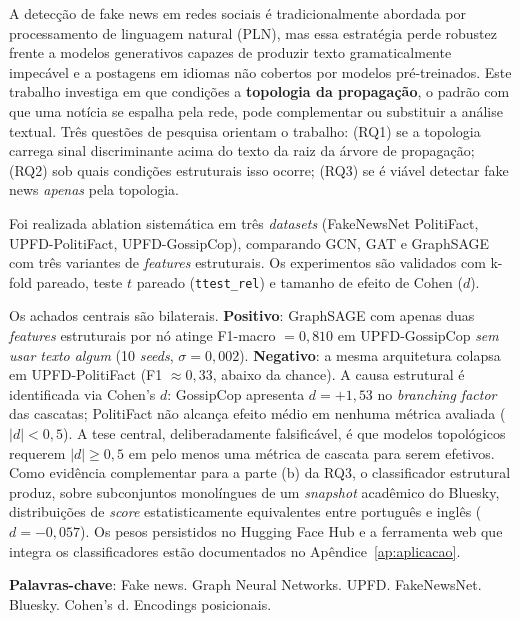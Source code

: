 \documentclass[12pt,oneside,a4paper]{abntex2}
\begin{document}

\imprimircapa
\imprimirfolhaderosto
\imprimirfolhadeaprovacao


\begin{resumo}
A detec\c{c}\~ao de fake news em redes sociais \'e tradicionalmente
abordada por processamento de linguagem natural (PLN), mas essa
estrat\'egia perde robustez frente a modelos generativos capazes de
produzir texto gramaticalmente impec\'avel e a postagens em idiomas
n\~ao cobertos por modelos pr\'e-treinados. Este trabalho investiga em
que condi\c{c}\~oes a \textbf{topologia da propaga\c{c}\~ao}, o padr\~ao
com que uma not\'icia se espalha pela rede, pode complementar ou
substituir a an\'alise textual. Tr\^es quest\~oes de pesquisa orientam o
trabalho: (RQ1) se a topologia carrega sinal discriminante acima do texto
da raiz da \'arvore de propaga\c{c}\~ao; (RQ2) sob quais condi\c{c}\~oes
estruturais isso ocorre; (RQ3) se \'e vi\'avel detectar fake news \emph{apenas} pela
topologia.

Foi realizada ablation sistem\'atica em tr\^es \emph{datasets} (FakeNewsNet
PolitiFact, UPFD-PolitiFact, UPFD-GossipCop), comparando GCN, GAT e
GraphSAGE com tr\^es variantes de \emph{features} estruturais. Os
experimentos s\~ao validados com k-fold pareado, teste $t$ pareado
(\texttt{ttest\_rel}) e tamanho de efeito de Cohen ($d$).

Os achados centrais s\~ao bilaterais. \textbf{Positivo}: GraphSAGE com
apenas duas \emph{features} estruturais por n\'o atinge F1-macro $=
0{,}810$ em UPFD-GossipCop \emph{sem usar texto algum} (10 \emph{seeds},
$\sigma = 0{,}002$). \textbf{Negativo}: a mesma arquitetura colapsa em
UPFD-PolitiFact (F1 $\approx 0{,}33$, abaixo da chance). A causa
estrutural \'e identificada via Cohen's $d$: GossipCop apresenta $d =
+1{,}53$ no \emph{branching factor} das cascatas; PolitiFact n\~ao
alcan\c{c}a efeito m\'edio em nenhuma m\'etrica avaliada ($|d| < 0{,}5$).
A tese central, deliberadamente falsific\'avel, \'e que modelos
topol\'ogicos requerem $|d| \geq 0{,}5$ em pelo menos uma m\'etrica de
cascata para serem efetivos. Como evid\^encia complementar para a parte
(b) da RQ3, o classificador estrutural produz, sobre subconjuntos
monol\'ingues de um \emph{snapshot} acad\^emico do Bluesky,
distribui\c{c}\~oes de \emph{score} estatisticamente equivalentes entre
portugu\^es e ingl\^es ($d = -0{,}057$). Os pesos persistidos no
Hugging Face Hub e a ferramenta web que integra os classificadores
est\~ao documentados no Ap\^endice~\ref{ap:aplicacao}.

\textbf{Palavras-chave}: Fake news. Graph Neural Networks. UPFD.
FakeNewsNet. Bluesky. Cohen's d. Encodings posicionais.
\end{resumo}
\end{document}
